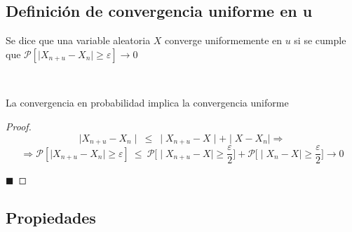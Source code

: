 \documentclass[12pt,a4paper]{book}
\newcommand*{\qed}{\hfill\ensuremath{\blacksquare}}
\begin{document}
\subsection{Definición de convergencia uniforme en u}

Se dice que una variable aleatoria $X$ converge uniformemente en $u$ si se cumple que $\mathcal{P}[\mid X_{n+u} - X_n \mid \geq \varepsilon] \to 0$

\begin{lemma}
\

La convergencia en probabilidad implica la convergencia uniforme
\end{lemma}

\begin{proof}
$$ \mid X_{n+u} - X_n \mid \ \leq \ \mid X_{n+u} - X \mid + \mid X - X_n \mid \Rightarrow$$
$$ \Rightarrow \mathcal{P}[\mid X_{n+u} - X_n \mid \geq \varepsilon] \ \leq \ \mathcal{P}\Big[\mid X_{n+u} - X \mid \geq \frac{\varepsilon}{2}\Big] + \mathcal{P}\Big[\mid X_{n} - X \mid \geq \frac{\varepsilon}{2}\Big] \to 0$$

\qed
\end{proof}

\subsection{Propiedades}
\end{document}
